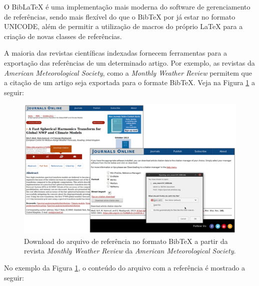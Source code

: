O Bib\LaTeX{} é uma implementação mais moderna do software de gerenciamento de referências, sendo mais flexível do que o Bib\TeX{} por já estar no formato UNICODE, além de permitir a utilização de macros do próprio \LaTeX{} para a criação de novas classes de referências.

A maioria das revistas científicas indexadas fornecem ferramentas para a exportação das referências de um determinado artigo. Por exemplo, as revistas da \textit{American Meteorological Society}, como a \textit{Monthly Weather Review} permitem que a citação de um artigo seja exportada para o formate Bib\TeX{}. Veja na Figura \ref{fig:exemplo_revista_ams_citacao} a seguir:

\begin{figure}[H]
\caption{Download do arquivo de referência no formato Bib\TeX{} a partir da revista \textit{Monthly Weather Review} da \textit{American Meteorological Society}.}
\vspace{6mm}
    \begin{center}
        \includegraphics[scale=0.4]{./figs/exemplo_revista_ams_citacao.pdf}
    \end{center}
\vspace{4mm}
\label{fig:exemplo_revista_ams_citacao}
\end{figure}

No exemplo da Figura \ref{fig:exemplo_revista_ams_citacao}, o conteúdo do arquivo com a referência é mostrado a seguir:

